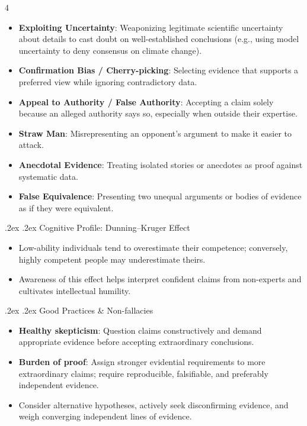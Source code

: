 \documentclass[10pt,landscape,a4paper]{article}
\makeatletter
\renewcommand{\subsection}{\@startsection{subsection}{1}{0mm}%
  {.2ex}%
  {.2ex}%
{\sffamily\bfseries}}
\makeatother
\begin{document}
\begin{multicols*}{4}
\begin{itemize}
    \item \textbf{Exploiting Uncertainty}: Weaponizing legitimate scientific uncertainty about details to cast doubt on well-established conclusions (e.g., using model uncertainty to deny consensus on climate change).
    \item \textbf{Confirmation Bias / Cherry-picking}: Selecting evidence that supports a preferred view while ignoring contradictory data.
    \item \textbf{Appeal to Authority / False Authority}: Accepting a claim solely because an alleged authority says so, especially when outside their expertise.
    \item \textbf{Straw Man}: Misrepresenting an opponent's argument to make it easier to attack.
    \item \textbf{Anecdotal Evidence}: Treating isolated stories or anecdotes as proof against systematic data.
    \item \textbf{False Equivalence}: Presenting two unequal arguments or bodies of evidence as if they were equivalent.
  \end{itemize}

  \subsection{Cognitive Profile: Dunning--Kruger Effect}
  \begin{itemize}
    \item Low-ability individuals tend to overestimate their competence; conversely, highly competent people may underestimate theirs.
    \item Awareness of this effect helps interpret confident claims from non-experts and cultivates intellectual humility.
  \end{itemize}

  \subsection{Good Practices \& Non-fallacies}
  \begin{itemize}
    \item \textbf{Healthy skepticism}: Question claims constructively and demand appropriate evidence before accepting extraordinary conclusions.
    \item \textbf{Burden of proof}: Assign stronger evidential requirements to more extraordinary claims; require reproducible, falsifiable, and preferably independent evidence.
    \item Consider alternative hypotheses, actively seek disconfirming evidence, and weigh converging independent lines of evidence.
  \end{itemize}


\end{multicols*}
\end{document}
